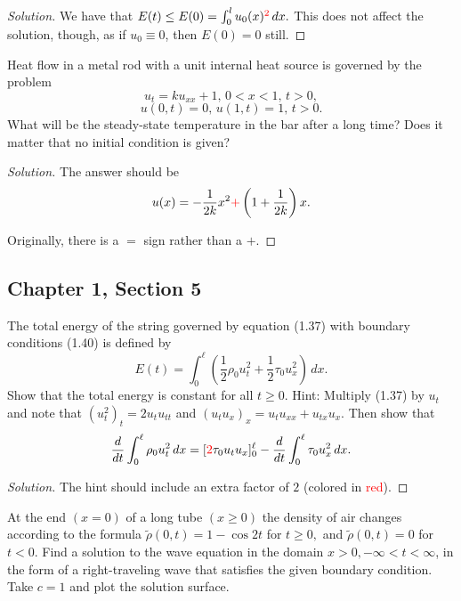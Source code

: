 \documentclass[11pt]{article}
\newenvironment{solution}
  {\renewcommand\qedsymbol{$\blacksquare$}\begin{proof}[Solution]}
  {\end{proof}}
\begin{document}
\begin{solution}
We have that $E(t) \leq E(0) = \int_0^l u_0(x)^{\textcolor{red}{2}} \, dx.$ This does not affect the solution, though, as if $u_0 \equiv 0$, then $E(0) = 0$ still.

\end{solution}

\begin{exercise}{6}
Heat flow in a metal rod with a unit internal heat source is governed by the problem
\[u_t=ku_{xx}+1, \, 0<x<1, \, t>0, \]
\[u(0,t)=0, \, u(1,t)=1, \, t>0. \]
What will be the steady-state temperature in the bar after a long time? Does it matter that no initial condition is given?
\end{exercise}

\begin{solution}
  The answer should be \[u(x) = -\frac{1}{2k}x^2 \textcolor{red}{+} \left(1+\frac{1}{2k}\right) x.\]

  Originally, there is a $=$ sign rather than a $+$.
\end{solution}

\setcounter{subsection}{4}
\subsection{Chapter 1, Section 5}

\begin{exercise}{5}The total energy of the string governed by equation (1.37) with boundary conditions (1.40) is defined by \[E(t) = \int_{0}^{\ell} \left( \frac{1}{2} \rho_0 u_t^2 + \frac{1}{2} \tau_0 u_x^2 \right) \, dx.\]
Show that the total energy is constant for all $ t \geq 0$. Hint: Multiply (1.37) by $u_t$ and note that $(u_t^2)_t = 2u_tu_{tt}$ and $(u_tu_x)_x = u_tu_{xx} + u_{tx}u_x.$ Then
show that \[\frac{d}{dt} \int_{0}^{\ell} \rho_0 u_t^2 \, dx= [\textcolor{red}{2}\tau_0u_tu_x]_0^\ell - \frac{d}{dt}  \int_{0}^{\ell} \tau_0 u_x^2 \, dx.\]
\end{exercise}

\begin{solution}
The hint should include an extra factor of $2$ (colored in \textcolor{red}{red}).
\end{solution}

\begin{exercise}{8}
  At the end $(x = 0)$ of a long tube $(x \geq 0)$ the density of air changes according to the formula $\tilde{\rho}(0,t) = 1 - \cos 2t$ for $t \geq 0,$ 
  and $\tilde{\rho}(0,t) = 0$ for $t < 0$. Find a solution to the wave equation in the domain $x>0, -\infty<t< \infty$, in the form of a 
  right-traveling wave that satisfies the given boundary condition. Take $c = 1$ and plot the solution surface.
\end{exercise}
\end{document}

